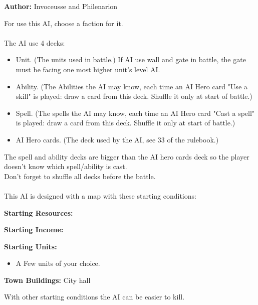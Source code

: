  
\textbf{Author:} Invoceusse and Philenarion

For use this AI, choose a faction for it.\\
\\

The AI use 4 decks:
\begin{itemize}
    \item Unit. (The units used in battle.) If AI use wall and gate in battle, the gate must be facing one most higher unit's level AI.
    \item Ability. (The Abilities the AI may know, each time an AI Hero card "Use a skill" is played: draw a card from this deck. Shuffle it only at start of battle.)
    \item Spell. (The spells the AI may know, each time an AI Hero card "Cast a spell" is played: draw a card from this deck. Shuffle it only at start of battle.)
    \item AI Hero cards. (The deck used by the AI, see 33 of the rulebook.)
\end{itemize}


The spell and ability decks are bigger than the AI hero cards deck so the player doesn't know which spell/ability is cast. \\
Don’t forget to shuffle all decks before the battle.\\
\\

This AI is designed with a map with these starting conditions:

\textbf{Starting Resources:}\par
{}

\textbf{Starting Income:}\par
{}

\textbf{Starting Units:}
\begin{itemize}
    \item A Few  units of your choice.
\end{itemize}

\textbf{Town Buildings:} City hall

With other starting conditions the AI can be easier to kill. 

\newpage

